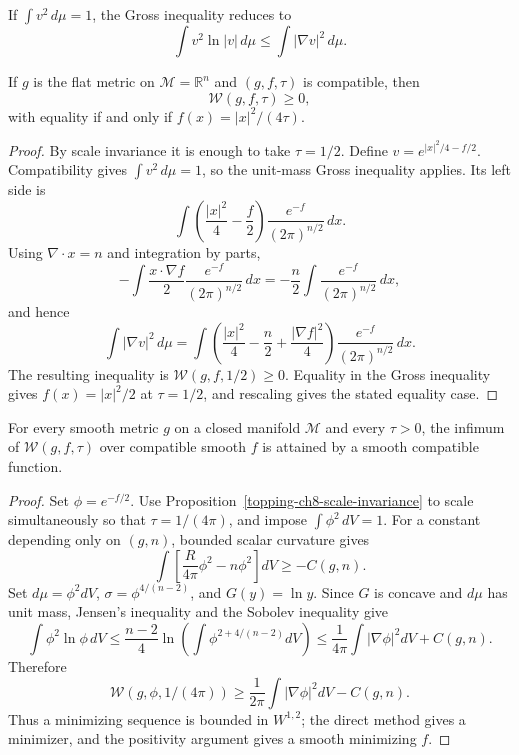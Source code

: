 \begin{remark}
\label{topping-ch8-gross-unit-mass}
If $\int v^2\,d\mu=1$, the Gross inequality reduces to
\[
\int v^2\ln|v|\,d\mu\leq\int|\nabla v|^2\,d\mu.
\]
\end{remark}

\begin{lemma}
\label{topping-ch8-euclidean-w-nonnegative}
If $g$ is the flat metric on $\mathcal M=\mathbb R^n$ and $(g,f,\tau)$ is
compatible, then
\[
\mathcal W(g,f,\tau)\geq0,
\]
with equality if and only if
$f(x)=|x|^2/(4\tau)$.
\end{lemma}

\begin{proof}
\sketch By scale invariance it is enough to take $\tau=1/2$. Define
$v=e^{|x|^2/4-f/2}$. Compatibility gives
$\int v^2\,d\mu=1$, so the unit-mass Gross inequality applies. Its left
side is
\[
\int\left(\frac{|x|^2}{4}-\frac f2\right)
\frac{e^{-f}}{(2\pi)^{n/2}}\,dx.
\]
Using $\nabla\!\cdot x=n$ and integration by parts,
\[
-\int\frac{x\cdot\nabla f}{2}\frac{e^{-f}}{(2\pi)^{n/2}}\,dx
=-\frac n2\int\frac{e^{-f}}{(2\pi)^{n/2}}\,dx,
\]
and hence
\[
\int|\nabla v|^2\,d\mu
=\int\left(\frac{|x|^2}{4}-\frac n2+\frac{|\nabla f|^2}{4}\right)
\frac{e^{-f}}{(2\pi)^{n/2}}\,dx.
\]
The resulting inequality is $\mathcal W(g,f,1/2)\geq0$. Equality in the
Gross inequality gives $f(x)=|x|^2/2$ at $\tau=1/2$, and rescaling gives the
stated equality case.
\end{proof}

\begin{lemma}
\label{topping-ch8-minimiser-exists}
For every smooth metric $g$ on a closed manifold $\mathcal M$ and every
$\tau>0$, the infimum of $\mathcal W(g,f,\tau)$ over compatible smooth $f$
is attained by a smooth compatible function.
\end{lemma}
\begin{proof}
\sketch Set $\phi=e^{-f/2}$. Use Proposition~\ref{topping-ch8-scale-invariance} to scale simultaneously
so that $\tau=1/(4\pi)$, and impose $\int\phi^2\,dV=1$. For a constant
depending only on $(g,n)$, bounded scalar curvature gives
\[
\int\left[\frac{R}{4\pi}\phi^2-n\phi^2\right]dV\geq-C(g,n).
\]
Set $d\mu=\phi^2dV$, $\sigma=\phi^{4/(n-2)}$, and $G(y)=\ln y$. Since
$G$ is concave and $d\mu$ has unit mass, Jensen's inequality and the Sobolev
inequality give
\[
\int\phi^2\ln\phi\,dV
\leq\frac{n-2}{4}\ln\left(\int\phi^{2+4/(n-2)}dV\right)
\leq\frac{1}{4\pi}\int|\nabla\phi|^2dV+C(g,n).
\]
Therefore
\[
\mathcal W(g,\phi,1/(4\pi))
\geq\frac{1}{2\pi}\int|\nabla\phi|^2dV-C(g,n).
\]
Thus a minimizing sequence is bounded in $W^{1,2}$; the direct method gives a
minimizer, and the positivity argument gives a smooth minimizing $f$.
\end{proof}

